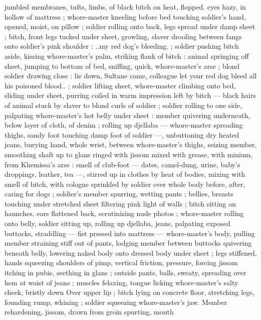 jumbled membranes, tufts, limbs, of black bitch on heat, flopped. 
eyes hazy, in hollow of mattress ; whore-master kneeling before bed 
touching soldier's hand, opened, moist, on pillow ; soldier rolling 
onto back, legs spread under damp sheet ; bitch, front legs tucked 
under sheet, growling, slaver drooling between fangs onto soldier's 
pink shoulder : {\td} {\gl}..my red dog's bleeding.{\gr} ; soldier pushing bitch 
aside, kissing whore-master's palm, striking flank of bitch : animal 
springing off sheet, jumping to bottom of bed, sniffing, quick, 
whore-master's arse ; blond soldier drawing close : {\td} {\gl} {\td} lie down, 
Sultane{\thd} come, colleague{\thd} let your red dog bleed all his poisoned 
blood..{\gr} ; soldier lifting sheet, whore-master climbing onto bed, 
sliding under sheet, purring coiled in warm impression left by bitch 
--- black hairs of animal stuck by slaver to blond curls of soldier ; 
soldier rolling to one side, palpating whore-master's hot belly under 
sheet : member quivering underneath, below layer of cloth, of denim 
; rolling up djellaba --- whore-master spreading thighs, sandy foot 
touching damp foot of soldier ---, unbuttoning dry heated jeans, 
burying hand, whole wrist, between whore-master's thighs, seizing 
member, smoothing shaft up to glans ringed with jissom mixed with 
grease, with minium, from Khemissa's arse : smell of club-foot --- 
dates, camel-dung, urine, baby's droppings, leather, tea ---, stirred 
up in clothes by heat of bodies, mixing with smell of bitch, with 
cologne sprinkled by soldier over whole body before, after, caring for 
dogs ; soldier's member spurring, wetting pants ; bellies, breasts 
touching under stretched sheet filtering pink light of walls ; bitch 
sitting on haunches, ears flattened back, scrutinizing nude photos ; 
whore-master rolling onto belly, soldier sitting up, rolling up djellaba, 
jeans, palpating exposed buttocks, straddling --- fist pressed into 
mattress --- whore-master's body, pulling member straining stiff out 
of pants, lodging member between buttocks quivering beneath belly, 
lowering naked body onto dressed body under sheet ; legs stiffened, 
hands squeezing shoulders of pimp, vertical friction, pressure, 
forcing jissom itching in pubis, seething in glans ; outside pants, 
balls, sweaty, spreading over hem at waist of jeans ; muscles 
felaxing, tongue licking whore-master's salty cheek, bristly down 
Over upper lip ; bitch lying on concrete floor, stretching legs, 
founding rump, whining ; soldier squeezing whore-master's jaw. 
Member rehardening, jissom, drawn from groin spurting, mouth 
